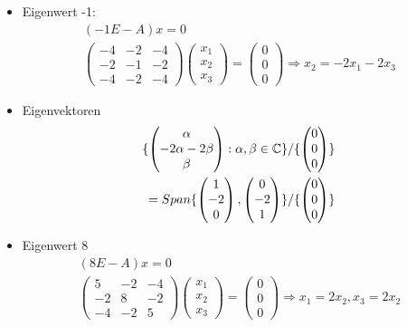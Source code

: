 \begin{itemize}
\item Eigenwert -1:
\begin{align}
(-1 E - A)x = 0 \\
\begin{pmatrix} -4 & -2 & -4 \\ -2 & -1 & -2 \\ -4 & -2 & -4 \end{pmatrix} \begin{pmatrix} x_1 \\ x_2 \\ x_3\end{pmatrix} = \begin{pmatrix} 0 \\ 0 \\ 0 \end{pmatrix} \Rightarrow x_2 = -2x_1-2x_3
\end{align}
\item Eigenvektoren
\begin{align}
\{\begin{pmatrix} \alpha \\ -2 \alpha -2 \beta \\ \beta\end{pmatrix}: \alpha, \beta \in \mathbb{C}\} / \{\begin{pmatrix} 0 \\ 0 \\0 \end{pmatrix}\} \\
= Span\{\begin{pmatrix} 1 \\ -2 \\ 0 \end{pmatrix}, \begin{pmatrix} 0 \\ -2 \\ 1 \end{pmatrix}\} / \{\begin{pmatrix} 0 \\ 0 \\ 0 \end{pmatrix}\}
\end{align}
\item Eigenwert 8
\begin{align}
(8 E - A)x = 0 \\
\begin{pmatrix} 5 & -2 & -4 \\ -2 & 8 & -2 \\ -4 & -2 & 5 \end{pmatrix} \begin{pmatrix} x_1 \\ x_2 \\ x_3\end{pmatrix} = \begin{pmatrix} 0 \\ 0 \\ 0 \end{pmatrix} \Rightarrow x_1 = 2x_2, x_3 = 2x_2

\end{align}
\end{itemize}
